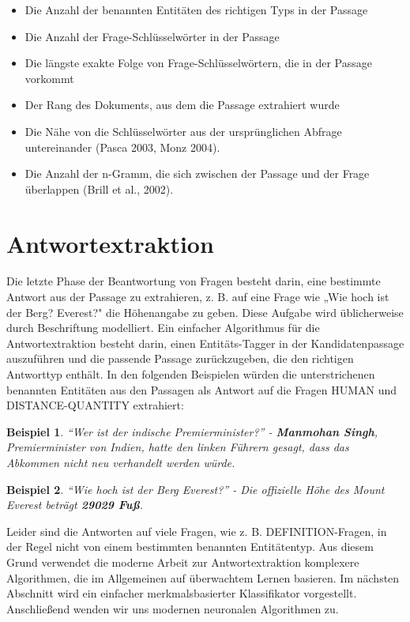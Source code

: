 \begin{itemize}
\item Die Anzahl der benannten Entitäten des richtigen Typs in der Passage
\item Die Anzahl der Frage-Schlüsselwörter in der Passage 
\item Die längste exakte Folge von Frage-Schlüsselwörtern, die in der Passage vorkommt
\item Der Rang des Dokuments, aus dem die Passage extrahiert wurde
\item Die Nähe von die Schlüsselwörter aus der ursprünglichen Abfrage untereinander (Pasca 2003, Monz 2004).
\item Die Anzahl der n-Gramm, die sich zwischen der Passage und der Frage überlappen (Brill et al., 2002).
\end{itemize}

\section{Antwortextraktion}
Die letzte Phase der Beantwortung von Fragen besteht darin, eine bestimmte Antwort aus der Passage zu extrahieren, z. B. auf eine Frage wie „Wie hoch ist der Berg? Everest?" die Höhenangabe zu geben. Diese Aufgabe wird üblicherweise durch Beschriftung modelliert. 
Ein einfacher Algorithmus für die Antwortextraktion besteht darin, einen Entitäts-Tagger in der Kandidatenpassage auszuführen und die passende Passage zurückzugeben, die den richtigen Antworttyp enthält. 
In den folgenden Beispielen würden die unterstrichenen benannten Entitäten aus den Passagen als Antwort auf die Fragen HUMAN und DISTANCE-QUANTITY extrahiert:

\newtheorem{example}{Beispiel}

\begin{example}
\enquote{Wer ist der indische Premierminister?} - \textbf{Manmohan Singh}, Premierminister von Indien, hatte den linken Führern gesagt, dass das Abkommen nicht neu verhandelt werden würde.

\end{example}
\begin{example}
\enquote{Wie hoch ist der Berg Everest?} - Die offizielle Höhe des Mount Everest beträgt \textbf{29029 Fuß}.
\end{example}

Leider sind die Antworten auf viele Fragen, wie z. B. DEFINITION-Fragen, in der Regel nicht von einem bestimmten benannten Entitätentyp. Aus diesem Grund verwendet die moderne Arbeit zur Antwortextraktion komplexere Algorithmen, die im Allgemeinen auf überwachtem Lernen basieren. Im nächsten Abschnitt wird ein einfacher merkmalsbasierter Klassifikator vorgestellt. Anschließend wenden wir uns modernen neuronalen Algorithmen zu.
